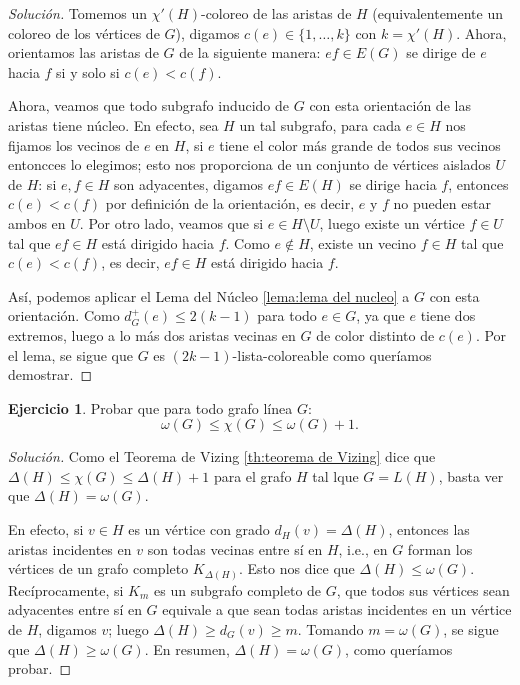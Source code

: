 \documentclass[12pt]{report}
\theoremstyle{plain}
\theoremstyle{definition}
\newtheorem{exercise}[theorem]{Ejercicio}
\newenvironment{solution}{\begin{proof}[Solución]}{\end{proof}}
\begin{document}
\begin{solution}
Tomemos un $\chi ' (H)$-coloreo de las aristas de $H$ (equivalentemente un coloreo de los vértices de $G$), digamos $c (e) \in \{1, \ldots, k \}$ con $k = \chi ' (H)$. Ahora, orientamos las aristas de $G$ de la siguiente manera: $e f \in E(G)$ se dirige de $e$ hacia $f$ si y solo si $c(e) < c(f)$.

Ahora, veamos que todo subgrafo inducido de $G$ con esta orientación de las aristas tiene núcleo. En efecto, sea $H$ un tal subgrafo, para cada $e \in H$ nos fijamos los vecinos de $e$ en $H$, si $e$ tiene el color más grande de todos sus vecinos entoncces lo elegimos; esto nos proporciona de un conjunto de vértices aislados $U$ de $H$: si $e, f \in H$ son adyacentes, digamos $ef \in E(H)$ se dirige hacia $f$, entonces $c(e) < c(f)$ por definición de la orientación, es decir, $e$ y $f$ no pueden estar ambos en $U$. Por otro lado, veamos que si $e \in H \setminus U$, luego existe un vértice $f \in U$ tal que $ef \in H$ está dirigido hacia $f$. Como $e \not \in H$, existe un vecino $f \in H$ tal que $c(e) < c(f)$, es decir, $ef \in H$ está dirigido hacia $f$.

Así, podemos aplicar el Lema del Núcleo \ref{lema:lema del nucleo} a $G$ con esta orientación. Como $d^+_G (e) \leq 2 (k-1)$ para todo $e \in G$, ya que $e$ tiene dos extremos, luego a lo más dos aristas vecinas en $G$ de color distinto de $c(e)$. Por el lema, se sigue que $G$ es $(2k - 1)$-lista-coloreable como queríamos demostrar.
\end{solution}

\begin{exercise}
Probar que para todo grafo línea $G$:
\[
    \omega (G) \leq \chi (G) \leq \omega (G) + 1.
\]
\end{exercise}
\begin{solution}
Como el Teorema de Vizing \ref{th:teorema de Vizing} dice que $\Delta (H) \leq \chi (G) \leq \Delta (H) + 1$ para el grafo $H$ tal lque $G = L(H)$, basta ver que $\Delta (H) = \omega (G)$.

En efecto, si $v \in H$ es un vértice con grado $d_H (v) = \Delta (H)$, entonces las aristas incidentes en $v$ son todas vecinas entre sí en $H$, i.e., en $G$ forman los vértices de un grafo completo $K_{\Delta(H)}$. Esto nos dice que $\Delta (H) \leq \omega (G)$. Recíprocamente, si $K_m$ es un subgrafo completo de $G$, que todos sus vértices sean adyacentes entre sí en $G$ equivale a que sean todas aristas incidentes en un vértice de $H$, digamos $v$; luego $\Delta (H) \geq d_G(v) \geq m$. Tomando $m = \omega (G)$, se sigue que $\Delta (H) \geq \omega (G)$. En resumen, $\Delta (H) = \omega (G)$, como queríamos probar.
\end{solution}
\end{document}
